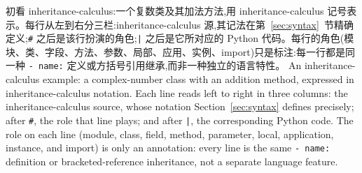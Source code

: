 \begin{CJK*}{UTF8}{gbsn}
\ifPaperChinese{}\fi
\begin{listing}[tbp]
  \caption{\ifPaperChinese
  初看 inheritance-calculus:一个复数类及其加法方法,用 inheritance-calculus 记号表示。每行从左到右分三栏:inheritance-calculus 源,其记法在第~\ref{sec:syntax}~节精确定义;\texttt{\#} 之后是该行扮演的角色;\texttt{|} 之后是它所对应的 Python 代码。每行的角色(模块、类、字段、方法、参数、局部、应用、实例、import)只是标注:每一行都是同一种 \texttt{- name:} 定义或方括号引用继承,而非一种独立的语言特性。
  \else
  An inheritance-calculus example: a complex-number class with an addition
  method, expressed in inheritance-calculus notation.
  Each line reads left to right in three columns: the inheritance-calculus
  source, whose notation Section~\ref{sec:syntax} defines precisely; after
  \texttt{\#}, the role that line plays; and after \texttt{|},
  the corresponding Python code.
  The role on each line (module, class, field, method, parameter, local,
  application, instance, and import) is only an annotation: every line is
  the same \texttt{- name:} definition or bracketed-reference
  inheritance, not a separate language feature.
  \fi}
  \label{lst:cheatsheet}
\end{listing}



\end{CJK*}
